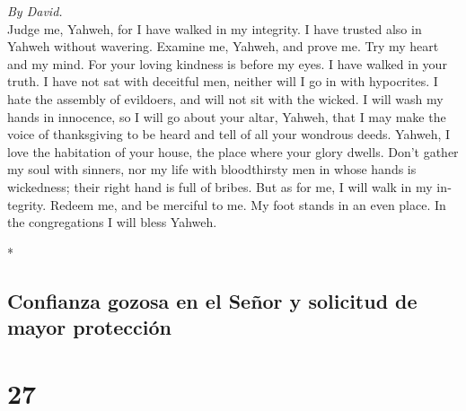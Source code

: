 \begin{paracol}{2}
\begin{otherlanguage}{english}
\emph{By David.}\\
 Judge me, Yahweh, for I have walked in my integrity. I
have trusted also in Yahweh without wavering.  Examine me,
Yahweh, and prove me. Try my heart and my mind.  For your
loving kindness is before my eyes. I have walked in your truth.
 I have not sat with deceitful men, neither will I go in
with hypocrites.  I hate the assembly of evildoers, and
will not sit with the wicked.  I will wash my hands in
innocence, so I will go about your altar, Yahweh,  that I
may make the voice of thanksgiving to be heard and tell of all your
wondrous deeds.  Yahweh, I love the habitation of your
house, the place where your glory dwells.  Don't gather my
soul with sinners, nor my life with bloodthirsty men  in
whose hands is wickedness; their right hand is full of bribes.
 But as for me, I will walk in my integrity. Redeem me,
and be merciful to me.  My foot stands in an even place.
In the congregations I will bless Yahweh.

\end{otherlanguage}

\switchcolumn[0]*

\hypertarget{confianza-gozosa-en-el-seuxf1or-y-solicitud-de-mayor-protecciuxf3n}{%
\subsection{Confianza gozosa en el Señor y solicitud de mayor
protección}\label{confianza-gozosa-en-el-seuxf1or-y-solicitud-de-mayor-protecciuxf3n}}

\hypertarget{section-52}{%
\section{27}\label{section-52}}


\end{paracol}
